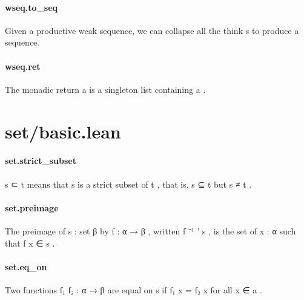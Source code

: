 \documentclass{article}
\begin{document}
\paragraph{wseq.to\_seq}
\par
Given a productive weak sequence, we can collapse all the 
\colorbox[RGB]{253,246,227}{{{{\color[RGB]{101, 123, 131} think }}}}s to
produce a sequence.
\paragraph{wseq.ret}
\par
The monadic 
\colorbox[RGB]{253,246,227}{{{{\color[RGB]{101, 123, 131} return a }}}} is a singleton list containing 
\colorbox[RGB]{253,246,227}{{{{\color[RGB]{101, 123, 131} a }}}}.
\section{set/basic.lean}\paragraph{set.strict\_subset}
\par
\colorbox[RGB]{253,246,227}{{{{\color[RGB]{101, 123, 131} s ⊂ t }}}} means that 
\colorbox[RGB]{253,246,227}{{{{\color[RGB]{101, 123, 131} s }}}} is a strict subset of 
\colorbox[RGB]{253,246,227}{{{{\color[RGB]{101, 123, 131} t }}}}, that is, 
\colorbox[RGB]{253,246,227}{{{{\color[RGB]{101, 123, 131} s ⊆ t }}}} but 
\colorbox[RGB]{253,246,227}{{{{\color[RGB]{101, 123, 131} s  }}}{{{\color[RGB]{181, 137, 0} ≠ }}}{{{\color[RGB]{101, 123, 131}  t }}}}.
\paragraph{set.preimage}
\par
The preimage of 
\colorbox[RGB]{253,246,227}{{{{\color[RGB]{101, 123, 131} s : set β }}}} by 
\colorbox[RGB]{253,246,227}{{{{\color[RGB]{101, 123, 131} f : α  }}}{{{\color[RGB]{133, 153, 0} → }}}{{{\color[RGB]{101, 123, 131}  β }}}}, written 
\colorbox[RGB]{253,246,227}{{{{\color[RGB]{101, 123, 131} f  }}}{{{\color[RGB]{181, 137, 0} ⁻¹ }}}{{{\color[RGB]{101, 123, 131} ' s }}}},
is the set of 
\colorbox[RGB]{253,246,227}{{{{\color[RGB]{101, 123, 131} x : α }}}} such that 
\colorbox[RGB]{253,246,227}{{{{\color[RGB]{101, 123, 131} f x ∈ s }}}}.
\paragraph{set.eq\_on}
\par
Two functions 
\colorbox[RGB]{253,246,227}{{{{\color[RGB]{101, 123, 131} f₁ f₂ : α  }}}{{{\color[RGB]{133, 153, 0} → }}}{{{\color[RGB]{101, 123, 131}  β }}}} are equal on 
\colorbox[RGB]{253,246,227}{{{{\color[RGB]{101, 123, 131} s }}}}if 
\colorbox[RGB]{253,246,227}{{{{\color[RGB]{101, 123, 131} f₁ x  }}}{{{\color[RGB]{181, 137, 0} = }}}{{{\color[RGB]{101, 123, 131}  f₂ x }}}} for all 
\colorbox[RGB]{253,246,227}{{{{\color[RGB]{101, 123, 131} x ∈ a }}}}.
\end{document}
